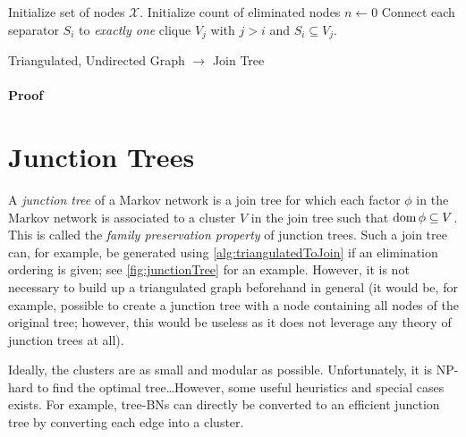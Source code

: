 			\begin{algorithm}  \DontPrintSemicolon
				Initialize set of nodes \(\mathcal{X}\). \;
				Initialize count of eliminated nodes \( n \gets 0 \) \;
				Connect each separator \(S_i\) to \emph{exactly one} clique \(V_j\) with \(j > i\) and \( S_i \subseteq V_j \).
				\caption{Triangulated, Undirected Graph \(\to\) Join Tree}
				\label{alg:triangulatedToJoin}
			\end{algorithm}

			\paragraph{Proof}

	\section{Junction Trees}
		\label{sec:junctionTrees}

		A \emph{junction tree} of a Markov network is a join tree for which each factor \(\phi\) in the Markov network is associated to a cluster \(V\) in the join tree such that \( \operatorname{dom} \phi \subseteq V \). This is called the \emph{family preservation property} of junction trees. Such a join tree can, for example, be generated using \autoref{alg:triangulatedToJoin} if an elimination ordering is given; see \autoref{fig:junctionTree} for an example. However, it is not necessary to build up a triangulated graph beforehand in general (it would be, for example, possible to create a junction tree with a node containing all nodes of the original tree; however, this would be useless as it does not leverage any theory of junction trees at all).

		Ideally, the clusters are as small and modular as possible. Unfortunately, it is NP-hard to find the optimal tree\dots However, some useful heuristics and special cases exists. For example, tree-BNs can directly be converted to an efficient junction tree by converting each edge into a cluster.

